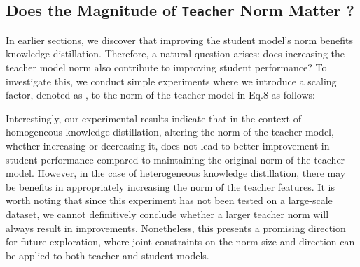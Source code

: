 \documentclass{article}
\begin{document}
\begin{table}[h]
    \centering
    \caption{\small Altering the norm of the {\tt teacher} mode with a scaling factor . Classification accuracy on the CIFAR-100 test set. The gray background indicates the default setting.
    }
    \vspace{1mm}
        \renewcommand{\arraystretch}{1.2}
\label{tab:suppl_tea_norm}
\end{table} \subsection{Does the Magnitude of {\tt Teacher} Norm Matter ?}


In earlier sections, we discover that improving the student model's norm benefits knowledge distillation. Therefore, a natural question arises: does increasing the teacher model norm also contribute to improving student performance?  To investigate this, we conduct simple experiments where we introduce a scaling factor, denoted as , to the norm of the teacher model in Eq.8 as follows:


Interestingly, our experimental results indicate that in the context of homogeneous knowledge distillation, altering the norm of the teacher model, whether increasing or decreasing it, does not lead to better improvement in student performance compared to maintaining the original norm of the teacher model. However, in the case of heterogeneous knowledge distillation, there may be benefits in appropriately increasing the norm of the teacher features. It is worth noting that since this experiment has not been tested on a large-scale dataset, we cannot definitively conclude whether a larger teacher norm will always result in improvements. Nonetheless, this presents a promising direction for future exploration, where joint constraints on the norm size and direction can be applied to both teacher and student models.
\end{document}
